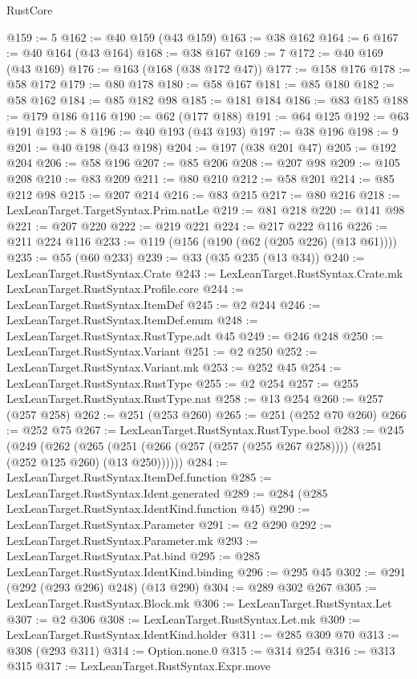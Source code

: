 \begin{lexlean}{RustCore}
\begin{coremodule}
@159 := 5
@162 := @40 @159 (@43 @159)
@163 := @38 @162
@164 := 6
@167 := @40 @164 (@43 @164)
@168 := @38 @167
@169 := 7
@172 := @40 @169 (@43 @169)
@176 := @163 (@168 (@38 @172 @47))
@177 := @158 @176
@178 := @58 @172
@179 := @80 @178
@180 := @58 @167
@181 := @85 @180
@182 := @58 @162
@184 := @85 @182 @98
@185 := @181 @184
@186 := @83 @185
@188 := @179 @186 @116
@190 := @62 (@177 @188)
@191 := @64 @125
@192 := @63 @191
@193 := 8
@196 := @40 @193 (@43 @193)
@197 := @38 @196
@198 := 9
@201 := @40 @198 (@43 @198)
@204 := @197 (@38 @201 @47)
@205 := @192 @204
@206 := @58 @196
@207 := @85 @206
@208 := @207 @98
@209 := @105 @208
@210 := @83 @209
@211 := @80 @210
@212 := @58 @201
@214 := @85 @212 @98
@215 := @207 @214
@216 := @83 @215
@217 := @80 @216
@218 := LexLeanTarget.TargetSyntax.Prim.natLe
@219 := @81 @218
@220 := @141 @98
@221 := @207 @220
@222 := @219 @221
@224 := @217 @222 @116
@226 := @211 @224 @116
@233 := @119 (@156 (@190 (@62 (@205 @226) (@13 @61))))
@235 := @55 (@60 @233)
@239 := @33 (@35 @235 (@13 @34))
@240 := LexLeanTarget.RustSyntax.Crate
@243 := LexLeanTarget.RustSyntax.Crate.mk LexLeanTarget.RustSyntax.Profile.core
@244 := LexLeanTarget.RustSyntax.ItemDef
@245 := @2 @244
@246 := LexLeanTarget.RustSyntax.ItemDef.enum
@248 := LexLeanTarget.RustSyntax.RustType.adt @45
@249 := @246 @248
@250 := LexLeanTarget.RustSyntax.Variant
@251 := @2 @250
@252 := LexLeanTarget.RustSyntax.Variant.mk
@253 := @252 @45
@254 := LexLeanTarget.RustSyntax.RustType
@255 := @2 @254
@257 := @255 LexLeanTarget.RustSyntax.RustType.nat
@258 := @13 @254
@260 := @257 (@257 @258)
@262 := @251 (@253 @260)
@265 := @251 (@252 @70 @260)
@266 := @252 @75
@267 := LexLeanTarget.RustSyntax.RustType.bool
@283 := @245
    (@249
      (@262 (@265 (@251 (@266 (@257 (@257 (@255 @267 @258)))) (@251 (@252 @125 @260) (@13 @250))))))
@284 := LexLeanTarget.RustSyntax.ItemDef.function
@285 := LexLeanTarget.RustSyntax.Ident.generated
@289 := @284 (@285 LexLeanTarget.RustSyntax.IdentKind.function @45)
@290 := LexLeanTarget.RustSyntax.Parameter
@291 := @2 @290
@292 := LexLeanTarget.RustSyntax.Parameter.mk
@293 := LexLeanTarget.RustSyntax.Pat.bind
@295 := @285 LexLeanTarget.RustSyntax.IdentKind.binding
@296 := @295 @45
@302 := @291 (@292 (@293 @296) @248) (@13 @290)
@304 := @289 @302 @267
@305 := LexLeanTarget.RustSyntax.Block.mk
@306 := LexLeanTarget.RustSyntax.Let
@307 := @2 @306
@308 := LexLeanTarget.RustSyntax.Let.mk
@309 := LexLeanTarget.RustSyntax.IdentKind.holder
@311 := @285 @309 @70
@313 := @308 (@293 @311)
@314 := Option.none.{0}
@315 := @314 @254
@316 := @313 @315
@317 := LexLeanTarget.RustSyntax.Expr.move

\end{coremodule}
\end{lexlean}
